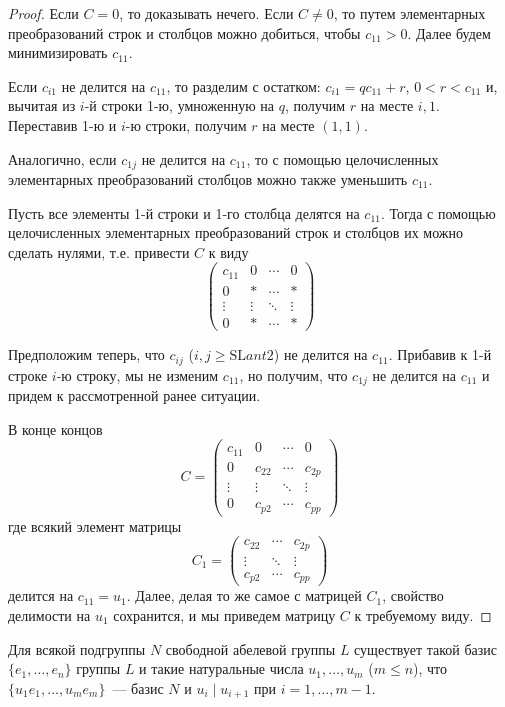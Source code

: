 \documentclass[a4paper]{article}
\begin{document}
\begin{proof}
Если $C=0$, то доказывать нечего. Если $C\neq 0$, то путем
элементарных преобразований строк и столбцов можно добиться, чтобы
$c_{11}>0$. Далее будем минимизировать $c_{11}$.

Если $c_{i1}$ не делится на $c_{11}$, то разделим с остатком:
$c_{i1}=qc_{11}+r$, $0<r<c_{11}$ и, вычитая из $i$-й строки 1-ю,
умноженную на $q$, получим $r$ на месте $i,1$. Переставив 1-ю и
$i$-ю строки, получим $r$ на месте $(1,1)$.

Аналогично, если $c_{1j}$ не делится на $c_{11}$, то с помощью
целочисленных элементарных преобразований столбцов можно также
уменьшить $c_{11}$.

Пусть все элементы 1-й строки и 1-го столбца делятся на $c_{11}$.
Тогда с помощью целочисленных элементарных преобразований строк и
столбцов их можно сделать нулями, т.е. привести $C$ к виду
$$\begin{pmatrix}
c_{11}& 0& \cdots& 0\\
0 & *& \cdots& *\\
\vdots & \vdots&\ddots &\vdots \\
0 & *&\cdots &*
\end{pmatrix}$$

Предположим теперь, что $c_{ij}$ ($i,j\geq\mathrm{SL}ant 2$) не
делится на $c_{11}$. Прибавив к 1-й строке $i$-ю строку, мы не
изменим $c_{11}$, но получим, что $c_{1j}$ не делится на $c_{11}$ и
придем к рассмотренной ранее ситуации.

В конце концов
$$C=\begin{pmatrix}
c_{11}& 0& \cdots& 0\\
0 & c_{22}& \cdots& c_{2p}\\
\vdots & \vdots&\ddots &\vdots \\
0 & c_{p2}&\cdots &c_{pp}
\end{pmatrix}$$
где всякий элемент матрицы
$$C_1=\begin{pmatrix}
c_{22}& \cdots& c_{2p}\\
\vdots & \ddots &\vdots \\
c_{p2} & \cdots &c_{pp}
\end{pmatrix}$$
делится на $c_{11}=u_1$. Далее, делая то же самое с матрицей $C_1$,
свойство делимости на $u_1$ сохранится, и мы приведем матрицу $C$ к
требуемому виду.
\end{proof}

\begin{theorem}
\label{2.V}Для всякой подгруппы $N$ свободной абелевой группы $L$
существует такой базис $\{e_1,\ldots,e_n\}$ группы $L$ и такие
натуральные числа $u_1,\ldots,u_m$ ($m\leqslant n$), что
$\{u_1e_1,\ldots,u_me_m\}$~--- базис $N$ и $u_i\mid u_{i+1}$ при
$i=1,\ldots,m-1$.
\end{theorem}
\end{document}
